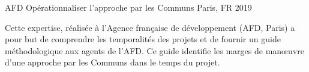 \begin{cventries}
  \cventry
    {AFD} %
    {Opérationnaliser l’approche par les Communs} %
    {Paris, FR} %
    {2019} %
    {
      \begin{cvitems} %
        Cette expertise, réalisée à l’Agence française de développement (AFD, Paris) a pour but de comprendre les temporalités des projets et de fournir un guide méthodologique aux agents de l’AFD. Ce guide identifie les marges de manœuvre d’une approche par les Communs dans le temps du projet.
      \end{cvitems}
    }

\end{cventries}
